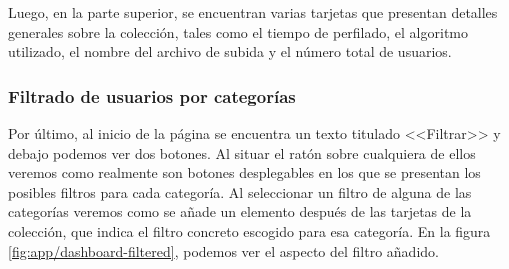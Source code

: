 Luego, en la parte superior, se encuentran varias tarjetas que presentan detalles generales sobre la colección, tales como el tiempo de perfilado, el algoritmo utilizado, el nombre del archivo de subida y el número total de usuarios.

\subsubsection{Filtrado de usuarios por categorías}
Por último, al inicio de la página se encuentra un texto titulado <<Filtrar>> y debajo podemos ver dos botones. Al situar el ratón sobre cualquiera de ellos veremos como realmente son botones desplegables en los que se presentan los posibles filtros para cada categoría. Al seleccionar un filtro de alguna de las categorías veremos como se añade un elemento después de las tarjetas de la colección, que indica el filtro concreto escogido para esa categoría. En la figura \ref{fig:app/dashboard-filtered}, podemos ver el aspecto del filtro añadido.

